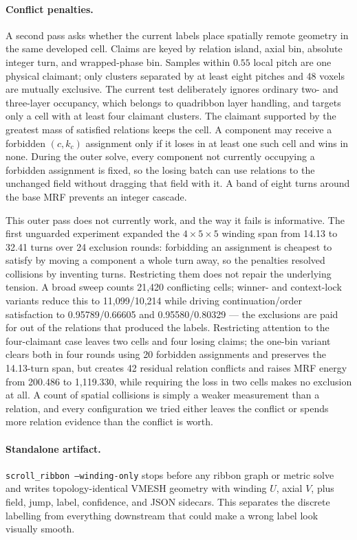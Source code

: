 \paragraph{Conflict penalties.} A second pass asks whether the current labels place spatially remote geometry in the same developed cell. Claims are keyed by relation island, axial bin, absolute integer turn, and wrapped-phase bin. Samples within $0.55$ local pitch are one physical claimant; only clusters separated by at least eight pitches and 48 voxels are mutually exclusive. The current test deliberately ignores ordinary two- and three-layer occupancy, which belongs to quadribbon layer handling, and targets only a cell with at least four claimant clusters. The claimant supported by the greatest mass of satisfied relations keeps the cell. A component may receive a forbidden $(c,k_c)$ assignment only if it loses in at least one such cell and wins in none. During the outer solve, every component not currently occupying a forbidden assignment is fixed, so the losing batch can use relations to the unchanged field without dragging that field with it. A band of eight turns around the base MRF prevents an integer cascade.

This outer pass does not currently work, and the way it fails is informative. The first unguarded experiment expanded the $4\times5\times5$ winding span from 14.13 to 32.41 turns over 24 exclusion rounds: forbidding an assignment is cheapest to satisfy by moving a component a whole turn away, so the penalties resolved collisions by inventing turns. Restricting them does not repair the underlying tension. A broad sweep counts 21,420 conflicting cells; winner- and context-lock variants reduce this to 11,099/10,214 while driving continuation/order satisfaction to 0.95789/0.66605 and 0.95580/0.80329 --- the exclusions are paid for out of the relations that produced the labels. Restricting attention to the four-claimant case leaves two cells and four losing claims; the one-bin variant clears both in four rounds using 20 forbidden assignments and preserves the 14.13-turn span, but creates 42 residual relation conflicts and raises MRF energy from 200.486 to 1,119.330, while requiring the loss in two cells makes no exclusion at all. A count of spatial collisions is simply a weaker measurement than a relation, and every configuration we tried either leaves the conflict or spends more relation evidence than the conflict is worth.

\paragraph{Standalone artifact.} \texttt{scroll\_ribbon --winding-only} stops before any ribbon graph or metric solve and writes topology-identical VMESH geometry with winding $U$, axial $V$, plus field, jump, label, confidence, and JSON sidecars. This separates the discrete labelling from everything downstream that could make a wrong label look visually smooth.


